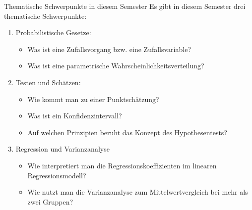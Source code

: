 \documentclass[usenames,dvipsnames,handout]{beamer}
\begin{document}
\begin{frame}{Thematische Schwerpunkte in diesem Semester}
Es gibt in diesem Semester drei thematische Schwerpunkte:
\begin{enumerate}
\item{\colorbox{blue!10}{Probabilistische Gesetze:   }
\begin{itemize}
\item{Was ist eine Zufallsvorgang bzw. eine Zufallsvariable?}
\item{Was ist eine parametrische  Wahrscheinlichkeitsverteilung?}
\end{itemize}
}
\item{\colorbox{green!40}{Testen und Schätzen:} 
\begin{itemize}
\item{Wie kommt man zu einer Punktschätzung?}
\item{Was ist ein Konfidenzintervall?}
\item{Auf welchen Prinzipien beruht das Konzept des Hypothesentests?}
\end{itemize}
}
\item{ \colorbox{violet!40}{Regression und Varianzanalyse}
\begin{itemize}
\item{Wie interpretiert man die Regressionskoeffizienten im linearen Regressionsmodell?}
\item{Wie nutzt man die Varianzanalyse zum Mittelwertvergleich bei mehr als zwei Gruppen?}
\end{itemize}
}
\end{enumerate}
\end{frame}
\end{document}
